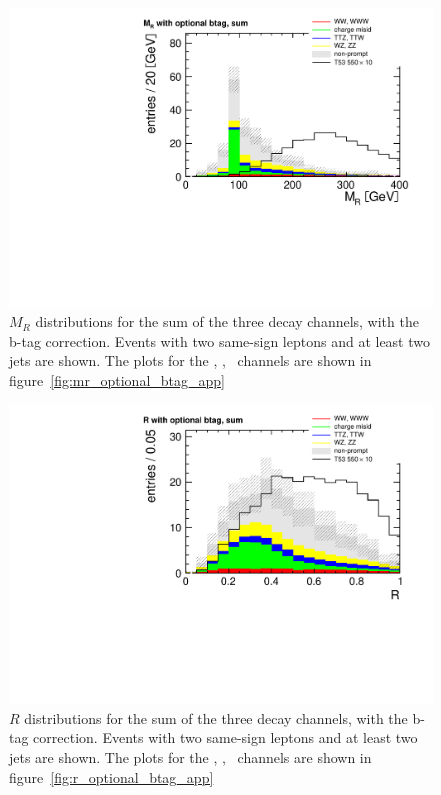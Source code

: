 \begin{figure}[htb]
    \centering
    \includegraphics[width=\textwidth]{images/pdf/mr_optional_btag_sum_0}
    \caption{$M_R$ distributions for the sum of the three decay channels,
        with the b-tag correction. Events with two same-sign leptons and at least
two jets are shown. The plots for the \E\E, \E\M, \M\M\ channels are
shown in figure~\ref{fig:mr_optional_btag_app}}
    \label{fig:mr_optional_btag}
\end{figure}

\begin{figure}[htb]
    \centering
    \includegraphics[width=\textwidth]{images/pdf/r_optional_btag_sum_0}
    \caption{$R$ distributions for the sum of the three decay channels,
        with the b-tag correction. Events with two same-sign leptons and at least
two jets are shown. The plots for the \E\E, \E\M, \M\M\ channels are
shown in figure~\ref{fig:r_optional_btag_app}}
    \label{fig:r_optional_btag}
\end{figure}

